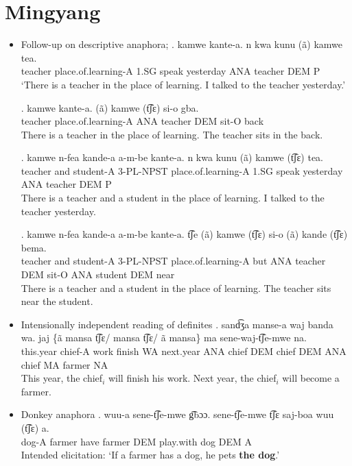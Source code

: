 \documentclass{assets/fieldnotes}
\begin{document}
\section{Mingyang}
\begin{itemize}
    \item Follow-up on descriptive anaphora;
    \exg. kamwe kante-a. n kwa kunu (ã) kamwe tea.\\
        teacher place.of.learning-A 1.SG speak yesterday ANA teacher DEM P\\
   `There is a teacher in the place of learning. I talked to the teacher yesterday.'

   \exg. kamwe kante-a. (ã) kamwe (t͡ʃɛ) si-o gba.\\
   teacher place.of.learning-A ANA teacher DEM sit-O back\\ 
   There is a teacher in the place of learning. The teacher sits in the back.

   \exg. kamwe n-fea kande-a a-m-be kante-a. n kwa kunu (ã) kamwe (t͡ʃɛ) tea.\\
   teacher and student-A 3-PL-NPST place.of.learning-A 1.SG speak yesterday ANA teacher DEM P\\
   There is a teacher and a student in the place of learning. I talked to the teacher yesterday.
   
   \exg. kamwe n-fea kande-a a-m-be kante-a. t͡ʃe (ã) kamwe (t͡ʃɛ) si-o (ã) kande (t͡ʃɛ) bema.\\
   teacher and student-A 3-PL-NPST place.of.learning-A but ANA teacher DEM sit-O ANA student DEM near\\
   There is a teacher and a student in the place of learning. The teacher sits near the student.

   \item Intensionally independent reading of definites
   \exg. sand͡ʒa manse-a waj banda wa. jaj \{ã mansa t͡ʃɛ/ mansa t͡ʃɛ/ ã mansa\} ma sene-waj-t͡ʃe-mwe na.\\
    this.year chief-A work finish WA next.year ANA chief DEM chief DEM ANA chief MA farmer NA\\
   This year, the chief$_i$ will finish his work. Next year, the chief$_i$ will become a farmer.

    

   \item Donkey anaphora 
    \exg. wuu-a sene-t͡ʃe-mwe g͡bɔɔ. sene-t͡ʃe-mwe t͡ʃɛ saj-boa wuu (t͡ʃɛ) a.\\
    dog-A farmer have farmer DEM play.with dog DEM A\\
    Intended elicitation: `If a farmer has a dog, he pets \textbf{the dog}.'
    

   
\end{itemize}
\end{document}
